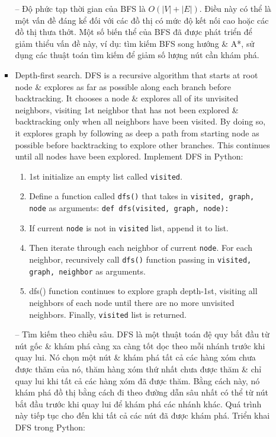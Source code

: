 \documentclass{article}
\begin{document}
\begin{itemize}
\begin{itemize}
\begin{itemize}
            -- Độ phức tạp thời gian của BFS là $O(|V| + |E|)$. Điều này có thể là một vấn đề đáng kể đối với các đồ thị có mức độ kết nối cao hoặc các đồ thị thưa thớt. Một số biến thể của BFS đã được phát triển để giảm thiểu vấn đề này, ví dụ: tìm kiếm BFS song hướng \& A*, sử dụng các thuật toán tìm kiếm để giảm số lượng nút cần khám phá.
            \item {\sf Depth-first search.} DFS is a recursive algorithm that starts at root node \& explores as far as possible along each branch before backtracking. It chooses a node \& explores all of its unvisited neighbors, visiting 1st neighbor that has not been explored \& backtracking only when all neighbors have been visited. By doing so, it explores graph by following as deep a path from starting node as possible before backtracking to explore other branches. This continues until all nodes have been explored. Implement DFS in Python:
            \begin{enumerate}
                \item 1st initialize an empty list called {\tt visited}.
                \item Define a function called {\tt dfs()} that takes in {\tt visited, graph, node} as arguments: {\tt def dfs(visited, graph, node):}
                \item If current {\tt node} is not in {\tt visited} list, append it to list.
                \item Then iterate through each neighbor of current {\tt node}. For each neighbor, recursively call {\tt dfs()} function passing in {\tt visited, graph, neighbor} as arguments.
                \item {\sf dfs()} function continues to explore graph depth-1st, visiting all neighbors of each node until there are no more unvisited neighbors. Finally, {\tt visited} list is returned.
            \end{enumerate}
            -- {\sf Tìm kiếm theo chiều sâu.} DFS là một thuật toán đệ quy bắt đầu từ nút gốc \& khám phá càng xa càng tốt dọc theo mỗi nhánh trước khi quay lui. Nó chọn một nút \& khám phá tất cả các hàng xóm chưa được thăm của nó, thăm hàng xóm thứ nhất chưa được thăm \& chỉ quay lui khi tất cả các hàng xóm đã được thăm. Bằng cách này, nó khám phá đồ thị bằng cách đi theo đường dẫn sâu nhất có thể từ nút bắt đầu trước khi quay lui để khám phá các nhánh khác. Quá trình này tiếp tục cho đến khi tất cả các nút đã được khám phá. Triển khai DFS trong Python:
            \begin{enumerate}

\end{enumerate}
\end{itemize}
\end{itemize}
\end{itemize}
\end{document}
